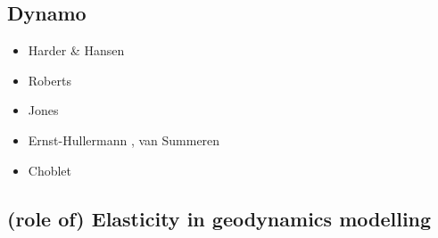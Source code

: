 \subsection{Dynamo}

\begin{scriptsize}
\begin{itemize}
\item[\twothousandfive] Harder \& Hansen \cite{haha05}
\item[\twothousandnine] Roberts \etal \cite{rolm09}
\item[\twothousandeleven] Jones \cite{jone11}
\item[\twothousandthirteen] Ernst-Hullermann \etal \cite{erhh13}, van Summeren \etal \cite{vagc13}
\item[\twothousandsixteen] Choblet \etal \cite{chah16}
\end{itemize}
\end{scriptsize}

\subsection{(role of) Elasticity in geodynamics modelling}

